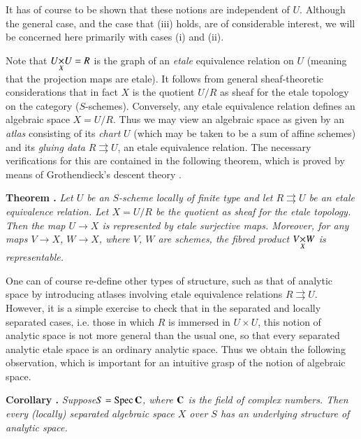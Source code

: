 It has of course to be shown that these notions are independent of $U$. Although the general case, and the case that (iii) holds, are of considerable interest, we will be concerned here primarily with cases (i) and (ii).

Note that $\fprod{U}{U}{X}=R$ is the graph of an {\em etale} equivalence relation on $U$ (meaning that the projection maps are etale). It follows from general sheaf-theoretic considerations \cite[II.4.3]{art02-key6} that in fact $X$ is the quotient $U/R$ as sheaf for the etale topology on the category ($S$-schemes). Conversely, any etale equivalence relation defines an algebraic space $X=U/R$. Thus we may view an algebraic space as given by an {\em atlas} consisting of its {\em chart} $U$ (which may be taken to be a sum of affine schemes) and its {\em gluing data} $R\rightrightarrows U$, an etale equivalence relation. The necessary verifications for this are contained in the following theorem, which is proved by means of Grothendieck's descent theory \cite[VIII]{art02-key14}.

\medskip
\noindent
{\bf Theorem .\label{art02-thm1.5}}
{\em Let $U$ be an $S$-scheme locally of finite type and let $R\rightrightarrows U$ be an etale equivalence relation. Let $X=U/R$ be the quotient as sheaf for the etale topology. Then the map $U\to X$ is represented by etale surjective maps. Moreover, for any maps $V\to X$, $W\to X$, where $V$, $W$ are schemes, the fibred product $\fprod{V}{W}{X}$ is representable.}
\smallskip

One can of course re-define other types of structure, such as that of analytic space by introducing atlases involving etale equivalence relations $R\rightrightarrows U$. However, it is a simple exercise to check that in the separated and locally separated cases, i.e. those in which $R$ is immersed in $U\times U$, this notion of analytic space is not more general than the usual one, so that every separated analytic etale space is an ordinary analytic space. Thus we obtain the following observation, which is important for an intuitive grasp of the notion of algebraic space.

\medskip
\noindent
{\bf Corollary .\label{art02-coro1.6}}
{\em Suppose\pageoriginale $S=\operatorname{Spec} \mathbf{C}$, where $\mathbf{C}$ is the field of complex numbers. Then every (locally) separated algebraic space $X$ over $S$ has an underlying structure of analytic space.}
\medskip

